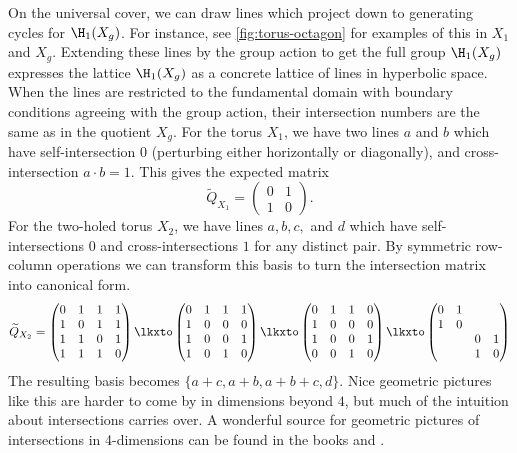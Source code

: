 \begin{example}
	On the universal cover, we can draw lines which project down to generating cycles for $\H_1(X_g)$. For instance, see \cref{fig:torus-octagon} for examples of this in $X_1$ and $X_g$. Extending these lines by the group action to get the full group $\H_1(X_g)$ expresses the lattice $\H_1(X_g)$ as a concrete lattice of lines in hyperbolic space.
	When the lines are restricted to the fundamental domain with boundary conditions agreeing with the group action, their intersection numbers are the same as in the quotient $X_g$. For the torus $X_1$, we have two lines $a$ and $b$ which have self-intersection $0$ (perturbing either horizontally or diagonally), and cross-intersection $a\cdot b = 1$. This gives the expected matrix
	\[
		\widetilde{Q}_{X_1}=\begin{pmatrix}0 & 1\\ 1 & 0\end{pmatrix}.
	\]
	For the two-holed torus $X_2$, we have lines $a,b,c,$ and $d$ which have self-intersections $0$ and cross-intersections $1$ for any distinct pair. By symmetric row-column operations we can transform this basis to turn the intersection matrix into canonical form.
	\[
		\widetilde{Q}_{X_2} =
		\begin{pmatrix}
			0 & 1 & 1 & 1 \\
			1 & 0 & 1 & 1 \\
			1 & 1 & 0 & 1 \\
			1 & 1 & 1 & 0
		\end{pmatrix}
		\lkxto
		\begin{pmatrix}
			0 & 1 & 1 & 1 \\
			1 & 0 & 0 & 0 \\
			1 & 0 & 0 & 1 \\
			1 & 0 & 1 & 0
		\end{pmatrix}
		\lkxto
		\begin{pmatrix}
			0 & 1 & 1 & 0 \\
			1 & 0 & 0 & 0 \\
			1 & 0 & 0 & 1 \\
			0 & 0 & 1 & 0
		\end{pmatrix}
		\lkxto
		\begin{pmatrix}
			0 & 1 &   &   \\
			1 & 0 &   &   \\
			  &   & 0 & 1 \\
			  &   & 1 & 0
		\end{pmatrix}
	\]
	The resulting basis becomes $\{a+c, a+b,a+b+c,d\}$. Nice geometric pictures like this are harder to come by in dimensions beyond $4$, but much of the intuition about intersections carries over. A wonderful source for geometric pictures of intersections in 4-dimensions can be found in the books \cite{behrens2021discembedding} and \cite{scorpan2005wild}.
\end{example}


